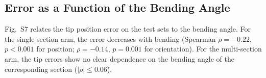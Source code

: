 \subsection{Error as a Function of the Bending Angle}
Fig.~S7 relates the tip position error on the test sets to the bending angle. For the single-section arm, the error decreases with bending (Spearman $\rho = -0.22$, $p < 0.001$ for position; $\rho = -0.14$, $p = 0.001$ for orientation). For the multi-section arm, the tip errors show no clear dependence on the bending angle of the corresponding section ($|\rho| \le 0.06$).
